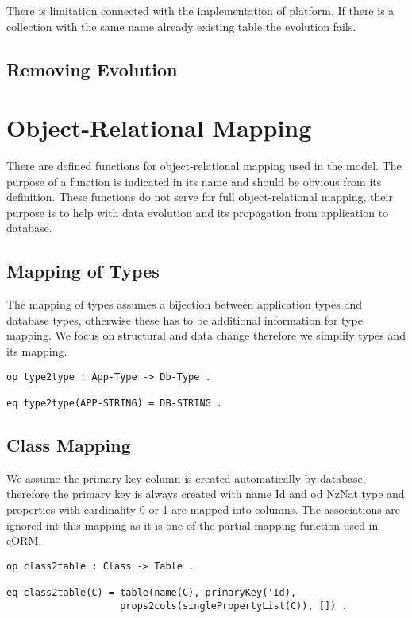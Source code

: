 \documentclass[11pt]{article}
\begin{document}
There is limitation connected with the implementation of platform. If there is a collection with the same name already existing table the evolution fails.

\subsection{Removing Evolution}



\newpage
\appendix
\section{Object-Relational Mapping}
There are defined functions for object-relational mapping used in the model. The purpose of a function is indicated in its name and should be obvious from its definition. These functions do not serve for full object-relational mapping, their purpose is to help with data evolution and its propagation from application to database.

\subsection{Mapping of Types}
The mapping of types assumes a bijection between application types and database types, otherwise these has to be additional information for type mapping. We focus on structural and data change therefore we simplify types and its mapping.
\begin{verbatim}
op type2type : App-Type -> Db-Type .

eq type2type(APP-STRING) = DB-STRING .
\end{verbatim}

\subsection{Class Mapping}
We assume the primary key column is created automatically by database, therefore the primary key is always created with name Id and od NzNat type and properties with cardinality 0 or 1 are mapped into columns. The associations are ignored int this mapping as it is one of the partial mapping function used in eORM.

\begin{verbatim}
op class2table : Class -> Table .

eq class2table(C) = table(name(C), primaryKey('Id), 
                    props2cols(singlePropertyList(C)), []) .
\end{verbatim}
\end{document}
